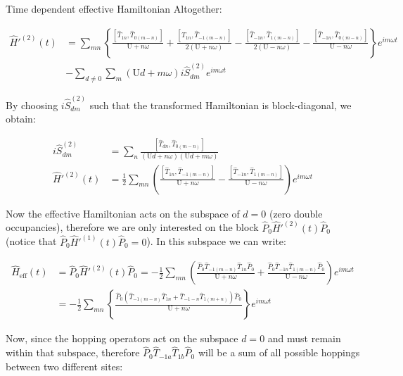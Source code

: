 \begin{section}{Time dependent effective Hamiltonian}
Altogether:

\begin{align*}
\hat{H}'^{(2)}(t) &= \sum_{mn} \left\{ \frac{\left[\hat{T}_{1n}, \hat{T}_{0(m-n)} \right]}{\text{U}+n\omega} + \frac{\left[\hat{T}_{1n}, \hat{T}_{-1(m-n)} \right]}{2(\text{U}+n\omega)} - \frac{\left[\hat{T}_{-1n}, \hat{T}_{1(m-n)} \right]}{2(\text{U}-n\omega)} - \frac{\left[\hat{T}_{-1n}, \hat{T}_{0(m-n)} \right]}{\text{U}-n\omega} \right\} e^{im\omega t} \\
&-\sum_{d\neq 0}\sum_m (\text{U}d+m\omega) i\hat{S}^{(2)}_{dm} e^{im\omega t}
\end{align*}

By choosing $i\hat{S}^{(2)}_{dm}$ such that the transformed Hamiltonian is block-diagonal, we obtain:

\begin{align}
i\hat{S}^{(2)}_{dm} &= \sum_n \frac{\left[ \hat{T}_{dn}, \hat{T}_{0(m-n)} \right]}{(\text{U}d+n\omega)(\text{U}d+m\omega)} \label{2ndOSpin}\\
\hat{H}'^{(2)}(t) &= \frac{1}{2}\sum_{mn} \left( \frac{\left[\hat{T}_{1n}, \hat{T}_{-1(m-n)} \right]}{\text{U}+n\omega} - \frac{\left[\hat{T}_{-1n}, \hat{T}_{1(m-n)} \right]}{\text{U}-n\omega} \right) e^{im\omega t} \label{2ndOH}
\end{align}

Now the effective Hamiltonian acts on the subspace of $d=0$ (zero double occupancies), therefore we are only interested on the block $\hat{P}_0 \hat{H}'^{(2)}(t) \hat{P}_0$ (notice that $\hat{P}_0 \hat{H}'^{(1)}(t) \hat{P}_0 = 0$). In this subspace we can write:

\begin{align}
\hat{H}_{\text{eff}}(t) &= \hat{P}_0\hat{H}'^{(2)}(t)\hat{P}_0 = -\frac{1}{2}\sum_{mn} \left( \frac{\hat{P}_0  \hat{T}_{-1(m-n)}\hat{T}_{1n}\hat{P}_0}{\text{U}+n\omega} + \frac{\hat{P}_0 \hat{T}_{-1n} \hat{T}_{1(m-n)} \hat{P}_0}{\text{U}-n\omega} \right) e^{im\omega t} \nonumber \\
&= -\frac{1}{2}\sum_{mn} \left\{ \frac{\hat{P}_0  (\hat{T}_{-1(m-n)}\hat{T}_{1n} + \hat{T}_{-1-n}\hat{T}_{1(m+n)})\hat{P}_0}{\text{U}+n\omega} \right\} e^{im\omega t} \label{2ndOHeff}
\end{align}

Now, since the hopping operators act on the subspace $d=0$ and must remain within that subspace, therefore $\hat{P}_0 \hat{T}_{-1a} \hat{T}_{1b} \hat{P}_0$ will be a sum of all possible hoppings between two different sites:


\end{section}
